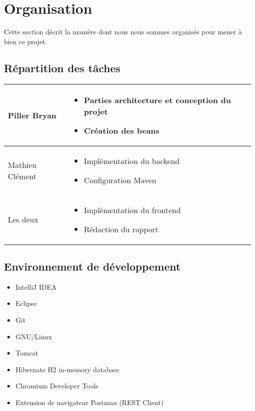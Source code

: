 \section{Organisation}

Cette section décrit la manière dont nous nous sommes organisés pour mener à bien ce projet.

\subsection{Répartition des tâches}

\begin{tabular}{|l|p{7cm}|l|}
\hline

Piller Bryan & 
\begin{itemize}
  \item Parties architecture et conception du projet
  \item Création des beans
\end{itemize}\\
\hline

Mathieu Clément & 
\begin{itemize}
  \item Implémentation du backend
  \item Configuration Maven   
\end{itemize}\\
\hline

Les deux &
\begin{itemize}
  \item Implémentation du frontend
  \item Rédaction du rapport
\end{itemize}\\
\hline

\end{tabular}

\subsection{Environnement de développement}
\begin{itemize}
\item IntelliJ IDEA
\item Eclipse
\item Git
\item GNU/Linux
\item Tomcat
\item Hibernate H2 in-memory database
\item Chromium Developer Tools
\item Extension de navigateur Postman (REST Client)
\end{itemize}

